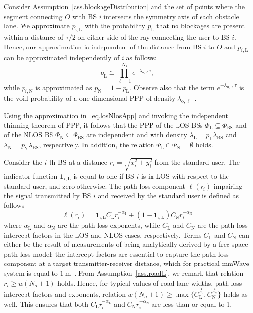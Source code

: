 \documentclass[10pt,journal,a4paper]{IEEEtran}
\begin{document}
Consider Assumption~\ref{ass.blockageDistribution} and the set of points where the segment connecting $O$ with BS $i$ intersects the symmetry axis of each obstacle lane. We approximate $p_{i,\mathrm{L}}$ with the probability $p_{\mathrm{L}}$ that no blockages are present within a distance of $\tau/2$ on either side of the ray connecting the user to BS $i$. Hence, our approximation is independent of the distance from BS $i$ to $O$ and $p_{i,\mathrm{L}}$ can be approximated independently of $i$ as follows: 
\begin{equation}
p_{\mathrm{L}} \cong \prod_{\ell=1}^{N_o} e^{-\lambda_{\mathrm{o},\ell}\tau}, \label{eq.losNlosApp}
\end{equation}
while $p_{i,\mathrm{N}}$ is approximated as $p_{\mathrm{N}} = 1 - p_{\mathrm{L}}$. Observe also that the term $e^{-\lambda_{\mathrm{O},\ell}\tau}$ is the void probability of a one-dimensional PPP of density $\lambda_{\mathrm{o},\ell}$~\cite{haenggi2013stochastic}.

Using the approximation in~\eqref{eq.losNlosApp} and invoking the independent thinning theorem of PPP, it follows that the PPP of the LOS BSs $\Phi_{\mathrm{L}} \subseteq \Phi_{\mathrm{BS}}$ and of the NLOS BS $\Phi_{\mathrm{N}} \subseteq \Phi_{\mathrm{BS}}$ are independent and with density $\lambda_{\mathrm{L}} = p_{\mathrm{L}} \lambda_{\mathrm{BS}}$ and $\lambda_{\mathrm{N}} = p_{\mathrm{N}} \lambda_{\mathrm{BS}}$, respectively. In addition, the relation $\Phi_{\mathrm{L}} \cap \Phi_{\mathrm{N}} = \emptyset$ holds.

Consider the $i$-th BS at a distance $r_i = \sqrt{x_i^2 + y_i^2}$ from the standard user. The indicator function $\mathbf{1}_{i,\mathrm{L}}$ is equal to one if BS $i$ is in LOS with respect to the standard user, and zero otherwise. The path loss component $\ell(r_i)$ impairing the signal transmitted by BS $i$ and received by the standard user is defined as follows:
\begin{equation}
\ell(r_i) = \mathbf{1}_{i,\mathrm{L}} C_\mathrm{L} r_i^{-\alpha_\mathrm{L}} + (1-\mathbf{1}_{i,\mathrm{L}}) C_\mathrm{N} r_i^{-\alpha_\mathrm{N}}\label{eq.PL}
\end{equation}
where $\alpha_\mathrm{L}$ and $\alpha_\mathrm{N}$ are the path loss exponents, while $C_\mathrm{L}$ and $C_\mathrm{N}$ are the path loss intercept factors in the LOS and NLOS cases, respectively.
{Terms $C_\mathrm{L}$ and $C_\mathrm{N}$ can either be the result of measurements of being analytically derived by a free space path loss model; the intercept factors are essential to capture the path loss component at a target transmitter-receiver distance, which for practical mmWave system is equal to $\SI{1}{\meter}$~\cite{7481506}.}
From Assumption~\ref{ass.roadL}, we remark that relation $r_i \geq w(N_o + 1)$ holds. Hence, for typical values of road lane widths, path loss intercept factors and exponents, relation $w(N_o + 1) \geq \max\{C_\mathrm{L}^{\frac{1}{\alpha_\mathrm{L}}},C_\mathrm{N}^{\frac{1}{\alpha_\mathrm{N}}}\}$ holds as well. This ensures that both $C_\mathrm{L} r_i^{-\alpha_\mathrm{L}}$ and $C_\mathrm{N} r_i^{-\alpha_\mathrm{N}}$ are less than or equal to $1$.
\end{document}
